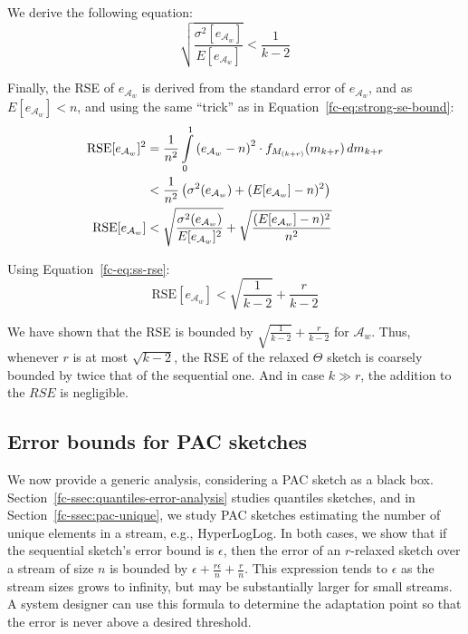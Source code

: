 We derive the following equation:
\begin{equation}
    \sqrt{\frac{\sigma^2[e_{{\mathcal{A}}_w}]}{E[e_{{\mathcal{A}}_w}]}}<\frac{1}{k-2}
    \label{fc-eq:ss-rse}
\end{equation}

Finally, the RSE of $e_{{\mathcal{A}}_w}$ is derived from the standard error of $e_{{\mathcal{A}}_w}$, and as $E[e_{{\mathcal{A}}_w}] < n$,
and using the same ``trick'' as in Equation~\ref{fc-eq:strong-se-bound}:
\begin{align*}
    \text{RSE}[e_{{\mathcal{A}}_w}]^2 &= \frac{1}{n^2}\int\limits_{0}^{1} \left( e_{{\mathcal{A}}_w} - n \right)^2 \cdot f_{M_{(k+r)}}(m_{k+r}) \,dm_{k+r} \\
    &< \frac{1}{n^2} \left(\sigma^2(e_{{\mathcal{A}}_w}) + (E[e_{{\mathcal{A}}_w}] - n)^2 \right)\\
    \text{RSE}[e_{{\mathcal{A}}_w}] &< \sqrt{\frac{\sigma^2(e_{{\mathcal{A}}_w})}{E[e_{{\mathcal{A}}_w}]^2}} + \sqrt{\frac{(E[e_{{\mathcal{A}}_w}] - n)^2}{n^2}}
\end{align*}

Using Equation~\ref{fc-eq:ss-rse}:
\begin{equation}
    \text{RSE}[e_{{\mathcal{A}}_w}] < \sqrt{\frac{1}{k-2}} + \frac{r}{k-2}
    \label{fc-eq:theta-rse-weak-bound}
\end{equation}

We have shown that the RSE
is bounded by $\sqrt{\frac{1}{k-2}} + \frac{r}{k-2}$ for ${{\mathcal{A}}}_w$.
Thus, whenever $r$ is at most $\sqrt{k-2}$, the RSE of the relaxed
$\Theta$ sketch is coarsely bounded by
twice that of the sequential one. And in case $k \gg r$, the addition to the $RSE$ is negligible.

\subsection{Error bounds for PAC sketches}

We now provide a generic analysis, considering a PAC sketch as a black box. 
Section~\ref{fc-ssec:quantiles-error-analysis} studies quantiles sketches, and 	
in Section~\ref{fc-ssec:pac-unique}, we study PAC sketches estimating the number of unique elements in a stream, e.g., HyperLogLog. 
In both cases, we show that if the sequential sketch's error bound is $\epsilon$, then 
the error of an $r$-relaxed sketch over a stream of size $n$ is bounded by $\epsilon+\frac{r \epsilon}{n}+\frac{r}{n}$. 
This expression tends to  $\epsilon$ as the stream sizes grows to infinity, but may be substantially larger for small streams. 
A system designer can use this formula to determine the adaptation point so that the error is never above a desired threshold. 


